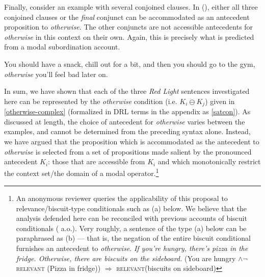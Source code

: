 Finally, consider an example with several conjoined clauses. In (\nextx), either all three conjoined clauses or the \textit{final} conjunct can be  accommodated as an antecedent proposition to \textit{otherwise}. The other conjuncts are not accessible antecedents for \textit{otherwise} in this context on their own. Again, this is precisely what is predicted from a modal subordination account.


\pex  You should have a snack, chill out for a bit, and then you should go to the gym, \textit{otherwise} you'll feel bad later on.\xe


In sum, we have shown that each of the three \textit{Red Light} sentences investigated here can be represented by the \textit{otherwise} condition (i.e. $ K_i\ominus K_j $) given in \ref{otherwise-complex} (formalized in DRL terms in the appendix as \ref{satcon}). %
As discussed at length, the choice of antecedent for \textit{otherwise} varies between the examples, and cannot be determined from the preceding syntax alone. Instead, we have argued that the proposition which is accommodated as the antecedent to \textit{otherwise} is selected from {a set of propositions made salient by the pronounced antecedent $ K_i $: those that are accessible from $ K_i $ and which monotonically restrict the context set/the domain of a modal operator.}\footnote{\label{biscuit}An anonymous reviewer queries the applicability of this proposal to relevance/biscuit-type conditionals such as (a) below. We believe that the analysis defended here can be reconciled with previous accounts of biscuit conditionals (\citealp[e.g.][]{Siegel2006, Franke2007} a.o.). Very roughly, a sentence of the type (a) below can be paraphrased as (b) --- that is, the negation of the entire biscuit conditional furnishes an antecedent to \textit{otherwise}.
	\pex\a \textit{If you're hungry, there's pizza in the fridge. \emph{Otherwise}, there are biscuits on the sideboard.}
	\a (You are hungry $ \wedge \neg$ \textsc{relevant} (Pizza in fridge)) $ \Rightarrow $ \textsc{relevant}(biscuits on sideboard)\xe
}


%
%
%

